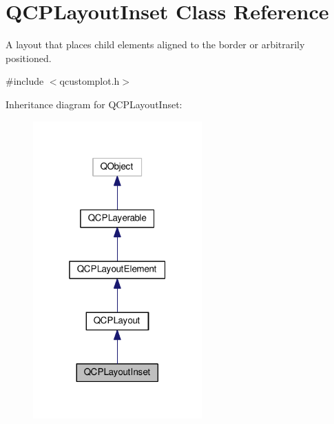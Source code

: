 \hypertarget{classQCPLayoutInset}{}\section{Q\+C\+P\+Layout\+Inset Class Reference}
\label{classQCPLayoutInset}


A layout that places child elements aligned to the border or arbitrarily positioned.  




{\ttfamily \#include $<$qcustomplot.\+h$>$}



Inheritance diagram for Q\+C\+P\+Layout\+Inset\+:\nopagebreak
\begin{figure}[H]
\begin{center}
\leavevmode
\includegraphics[width=184pt]{classQCPLayoutInset__inherit__graph}
\end{center}
\end{figure}


